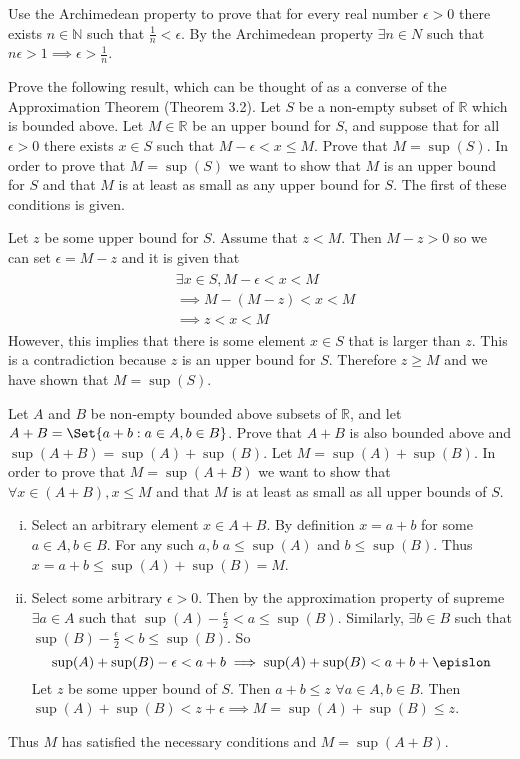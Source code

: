 \documentclass[paper=a4, fontsize=11pt]{jhwhw} %
\begin{document}
Use the Archimedean property to prove that for every real number $\epsilon > 0$ there exists $n\in \mathbb N$ such that $\frac{1}{n} < \epsilon$. 
\solution
By the Archimedean property $\exists n\in N$ such that $n\epsilon > 1 \implies \epsilon > \frac{1}{n}$.

Prove the following result, which can be thought of as a converse of the Approximation Theorem (Theorem 3.2). Let $S$ be a non-empty subset of $\mathbb R$ which is bounded above. Let $M\in \mathbb R$ be an upper bound for $S$, and suppose that for all $\epsilon > 0$ there exists $x\in S$ such that $M-\epsilon < x\le M$. Prove that $M = \sup(S)$. 
\solution
In order to prove that $M = \sup(S)$ we want to show that $M$ is an upper bound for $S$ and that $M$ is at least as small as any upper bound for $S$. The first of these conditions is given.

Let $z$ be some upper bound for $S$. Assume that $z < M$. Then $M - z > 0$ so we can set $\epsilon = M - z$ and it is given that 
\begin{align}
    \begin{split}
        &\exists x \in S, M-\epsilon < x < M\\
        &\implies M - ( M - z) < x < M\\
        &\implies z < x < M
    \end{split}
\end{align}
However, this implies that there is some element $x\in S$ that is larger than $z$. This is a contradiction because $z$ is an upper bound for $S$. Therefore $z \ge M$ and we have shown that $M = \sup(S)$. 

Let $A$ and $B$ be non-empty bounded above subsets of $\mathbb R$, and let $A + B = \Set{a + b:a\in A, b\in B}$. Prove that $A + B$ is also bounded above and $\sup(A+B) = \sup(A) + \sup(B)$. 
\solution
Let $M = \sup(A) + \sup(B)$. In order to prove that $M = \sup(A+B)$ we want to show that $\forall x \in (A+B), x\le M$ and that $M$ is at least as small as all upper bounds of $S$. 
\begin{enumerate}[i.]
    \item Select an arbitrary element $x\in A+B$. By definition $x = a+b$ for some $a\in A, b\in B$. For any such $a, b$ $a\le \sup(A)$ and $b\le \sup(B)$. Thus $x = a + b \le \sup(A) + \sup(B) = M$.

    \item Select some arbitrary $\epsilon > 0$. Then by the approximation property of supreme $\exists a\in A$ such that $\sup(A) - \frac{\epsilon}{2} < a \le \sup(B)$. Similarly, $\exists b\in B$ such that $\sup(B) - \frac{\epsilon}{2} < b \le \sup(B)$. So
        $$\sup(A) + \sup(B) - \epsilon < a +b\implies \sup(A) + \sup(B) < a + b + \epislon$$
        Let $z$ be some upper bound of $S$. Then $a + b \le z$ $\forall a\in A, b\in B$. Then $\sup(A) + \sup(B) < z + \epsilon \implies M = \sup(A) + \sup(B) \le z$. 
\end{enumerate}
Thus $M$ has satisfied the necessary conditions and $M = \sup(A+B)$. 
\end{document}
